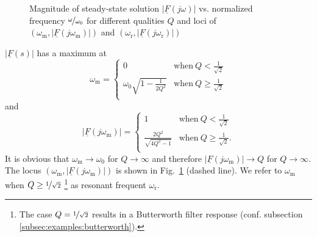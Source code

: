 \documentclass{article}[11pt]
\begin{document}
\begin{figure}[H]
  \caption{Magnitude of steady-state solution 
    $\left|\underline{F}(j\omega)\right|$ vs. normalized 
    frequency $\nicefrac{\omega}{\omega_0}$ for different qualities $Q$ and loci 
    of $(\omega_{\mathrm{m}}, \left|\underline{F}(j\omega_{\mathrm{m}})\right|)$
    and $(\omega_{\mathrm{r}}, \left|\underline{F}(j\omega_{\mathrm{r}})\right|)$}
  \label{fig:plot-fs}
\end{figure}

$\left|\underline{F}(s)\right|$ has a maximum at 
\begin{equation}
\omega_{\mathrm{m}}=
\begin{cases}
0 & \mathrm{when} \ Q <\frac{1}{\sqrt{2}} \\
\omega_0 \sqrt{1-\frac{1}{2Q^2}} & \mathrm{when} \ Q\geq\frac{1}{\sqrt{2}} \\
\end{cases} 
\end{equation}
and
\begin{equation}
\left|\underline{F}(j\omega_{\mathrm{m}})\right| =
\begin{cases}
1 & \mathrm{when} \ Q <\frac{1}{\sqrt{2}} \\
\frac{2 Q^2}{\sqrt{4Q^2-1}} & \mathrm{when} \ Q\geq\frac{1}{\sqrt{2}}. \\
\end{cases} 
\end{equation}
It is obvious that  $\omega_{\mathrm{m}} \rightarrow \omega_{\mathrm{0}}$
for $Q \rightarrow \infty$ and therefore 
$\left|\underline{F}(j\omega_{\mathrm{m}})\right| \rightarrow  Q$
for $Q \rightarrow \infty$.
The locus $(\omega_{\mathrm{m}}, \left|\underline{F}(j\omega_{\mathrm{m}})\right|)$
is shown in Fig.~\ref{fig:plot-fs} (dashed line).
We refer to $\omega_{\mathrm{m}}$ when $Q\geq\nicefrac{1}{\sqrt{2}}$%
\footnote{The case $Q = \nicefrac{1}{\sqrt{2}}$  results
in a Butterworth filter response 
(conf. subsection \ref{subsec:examples:butterworth}).}
as resonant frequent $\omega_{\mathrm{r}}$.
\end{document}
